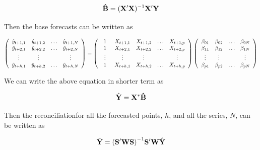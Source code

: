 \documentclass[11pt,a4paper,]{article}
\begin{document}
\begin{equation}
{\bf \hat B} = ({\bf X' X})^{-1} {\bf X' Y}
\end{equation}

Then the base forecasts can be written as

\begin{equation}
\left(\begin{array}{cccc}  
 \hat{y}_{t+1,1} & \hat{y}_{t+1,2} & \dots & \hat{y}_{t+1,N}\\
 \hat{y}_{t+2,1} & \hat{y}_{t+2,2} & \dots & \hat{y}_{t+2,N}\\
 \vdotswithin{\ddots} & \vdotswithin{\ddots} & & \vdotswithin{\ddots}\\
 \hat{y}_{t+h,1} & \hat{y}_{t+h,2} & \dots & \hat{y}_{t+h,N}\\
 \end{array}\right) = 
 \left(\begin{array}{ccccc}
 1 & X_{t+1,1} & X_{t+1,2} & \dots & X_{t+1,p}\\
 1 & X_{t+2,1} & X_{t+2,2} & \dots & X_{t+2,p}\\
 \vdotswithin{\ddots} & \vdotswithin{\ddots} & \vdotswithin{\ddots} & & \vdotswithin{\ddots}\\
 1 & X_{t+h,1} & X_{t+h,2} & \dots & X_{t+h,p}
 \end{array}\right)
 \left(\begin{array}{cccc}
 \beta_{01} & \beta_{02} & \dots & \beta_{0N}\\
 \beta_{11} & \beta_{12} & \dots & \beta_{1N}\\
 \vdotswithin{\ddots} & \vdotswithin{\ddots} & & \vdotswithin{\ddots}\\
 \beta_{p1} & \beta_{p2} & \dots & \beta_{pN}
 \end{array}\right)
\end{equation}

We can write the above equation in shorter term as

\begin{equation}\label{eq:baseforecatssameX}
{\hat{\bf Y}} = {\bf X}^* {\bf \hat B}
\end{equation}

Then the reconciliationfor all the forecasted points, \(h\), and all the
series, \(N\), can be written as

\begin{equation}\label{eq:recforecastssameX}
{\tilde{\bf Y}} = {(\bf S'WS)}^{-1}{\bf S'W} {\hat{\bf Y}}
\end{equation}
\end{document}
